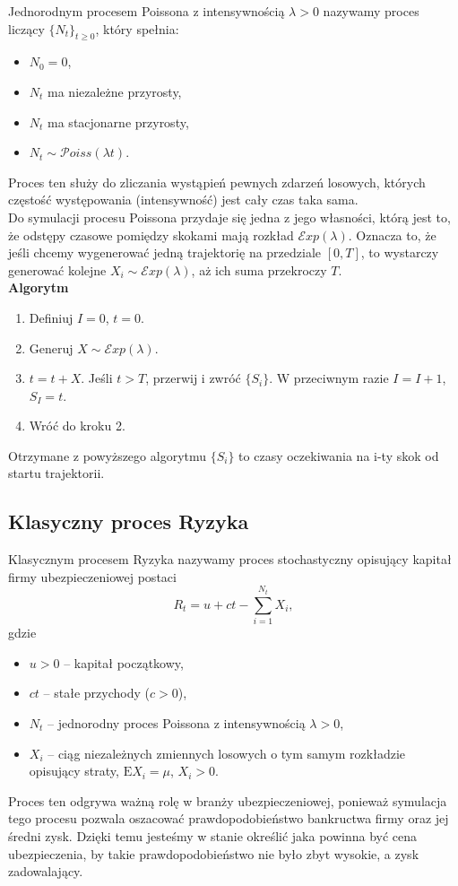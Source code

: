 \documentclass[12pt]{mwart}
\begin{document}
	\noindent Jednorodnym procesem Poissona z intensywnością $\lambda > 0$ nazywamy proces liczący $\{N_t\}_{t \geq 0}$, który spełnia:
	\begin{itemize}
		\item $N_0 = 0$,
		\item $N_t$ ma niezależne przyrosty,
		\item $N_t$ ma stacjonarne przyrosty,
		\item $N_t \sim \mathcal{P}oiss(\lambda t)$.
	\end{itemize}
	Proces ten służy do zliczania wystąpień pewnych zdarzeń losowych, których częstość występowania (intensywność) jest cały czas taka sama.\\
	
	\noindent Do symulacji procesu Poissona przydaje się jedna z jego własności, którą jest to, że odstępy czasowe pomiędzy skokami mają rozkład $\mathcal{E}xp(\lambda)$.
	Oznacza to, że jeśli chcemy wygenerować jedną trajektorię na przedziale $[0, T]$, to wystarczy generować kolejne $X_i \sim \mathcal{E}xp(\lambda)$, aż ich suma przekroczy $T$.\\
	
	\noindent \textbf{Algorytm}
	\begin{enumerate}
		\item Definiuj $I = 0$, $t=0$.
		\item Generuj $X \sim \mathcal{E}xp(\lambda)$.
		\item $t = t + X$. Jeśli $t > T$, przerwij i zwróć $\{S_i\}$. W przeciwnym razie $I = I + 1$, $S_I = t$.
		\item Wróć do kroku 2.
	\end{enumerate}
	Otrzymane z powyższego algorytmu $\{S_i\}$ to czasy oczekiwania na i-ty skok od startu trajektorii.
	
	
	
	\subsection{Klasyczny proces Ryzyka}
	
	\noindent Klasycznym procesem Ryzyka nazywamy proces stochastyczny opisujący kapitał firmy ubezpieczeniowej postaci
	$$ R_t = u + ct - \sum_{i=1}^{N_t} X_i, $$
	gdzie
	\begin{itemize}[label=\textbf{.}]
		\item $u > 0$ -- kapitał początkowy,
		\item $ct$ -- stałe przychody ($c > 0$),
		\item $N_t$ -- jednorodny proces Poissona z intensywnością $\lambda > 0$,
		\item $X_i$ -- ciąg niezależnych zmiennych losowych o tym samym rozkładzie opisujący straty, $\mathrm{E}X_i = \mu$, $X_i > 0$.
	\end{itemize}
	Proces ten odgrywa ważną rolę w branży ubezpieczeniowej, ponieważ symulacja tego procesu pozwala oszacować prawdopodobieństwo bankructwa firmy oraz jej średni zysk. Dzięki temu jesteśmy w stanie określić jaka powinna być cena ubezpieczenia, by takie prawdopodobieństwo nie było zbyt wysokie, a zysk zadowalający.\\
	
\end{document}
